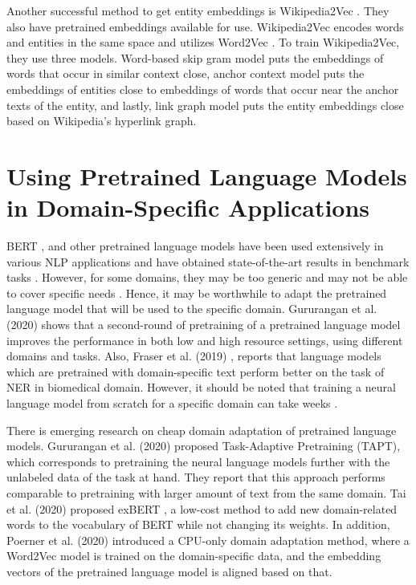 \documentclass{report}
\theoremstyle{definition}
\theoremstyle{remark}
\begin{document}
Another successful method to get entity embeddings is Wikipedia2Vec \cite{wikipedia2vec2}. They also have pretrained embeddings available for use. Wikipedia2Vec encodes words and entities in the same space and utilizes Word2Vec \cite{w2v}. To train Wikipedia2Vec, they use three models. Word-based skip gram model puts the embeddings of words that occur in similar context close, anchor context model puts the embeddings of entities close to embeddings of words that occur near the anchor texts of the entity, and lastly, link graph model puts the entity embeddings close based on Wikipedia's hyperlink graph. 





\section{Using Pretrained Language Models in Domain-Specific Applications}
\label{preLMDiffDomain}
BERT \cite{BERT}, and other pretrained language models have been used extensively in various NLP applications and have obtained state-of-the-art results in benchmark tasks \cite{pretrainedLM}. However, for some domains, they may be too generic and may not be able to cover specific needs \cite{quote2}. Hence, it may be worthwhile to adapt the pretrained language model that will be used to the specific domain. Gururangan et al. (2020) \cite{DontStop} shows that a second-round of pretraining of a pretrained language model improves the performance in both low and high resource settings, using different domains and tasks. Also, Fraser et al. (2019) \cite{quote3}, reports that language models which are pretrained with domain-specific text perform better on the task of NER in biomedical domain. However, it should be noted that training a neural language model from scratch for a specific domain can take weeks \cite{tritrain}. 

There is emerging research on cheap domain adaptation of pretrained language models. Gururangan et al. (2020) \cite{DontStop} proposed Task-Adaptive Pretraining (TAPT), which corresponds to pretraining the neural language models further with the unlabeled data of the task at hand. They report that this approach performs comparable to pretraining with larger amount of text from the same domain. Tai et al. (2020) proposed exBERT \cite{exBERT}, a low-cost method to add new domain-related words to the vocabulary of BERT \cite{BERT} while not changing its weights. In addition, Poerner et al. (2020) \cite{word2vectoBERT} introduced a CPU-only domain adaptation method, where a Word2Vec \cite{w2v} model is trained on the domain-specific data, and the embedding vectors of the pretrained language model is aligned based on that.
\end{document}
